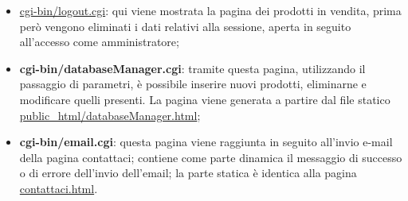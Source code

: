 {\begin{itemize}
		\item \href{http://tecnologie-web.studenti.math.unipd.it/tecweb/~pgabelli/cgi-bin/logout.cgi}{cgi-bin/logout.cgi}: qui viene mostrata la pagina dei prodotti in vendita, prima però vengono eliminati i dati relativi alla sessione, aperta in seguito all'accesso come amministratore;
		\item \textbf{cgi-bin/databaseManager.cgi}: tramite questa pagina, utilizzando il passaggio di parametri, è possibile inserire nuovi prodotti, eliminarne e modificare quelli presenti. La pagina viene generata a partire dal file statico \href{http://tecnologie-web.studenti.math.unipd.it/tecweb/~pgabelli/databaseManager.html}{public\_html/databaseManager.html};
		\item \textbf{cgi-bin/email.cgi}: questa pagina viene raggiunta in seguito all'invio e-mail della pagina contattaci; contiene come parte dinamica il messaggio di successo o di errore dell'invio dell'email; la parte statica è identica alla pagina \href{http://tecnologie-web.studenti.math.unipd.it/tecweb/~pgabelli/contattaci.html}{contattaci.html}.
	\end{itemize}
}